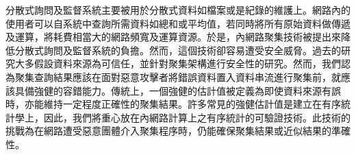 	
   分散式詢問及監督系統主要被用於分散式資料如檔案或是紀錄的維護上。網路內的使用者可以自系統中查詢所需資料如總和或平均值，若同時將所有原始資料做傳遞及運算，將耗費相當大的網路頻寬及運算資源。於是，內網路聚集技術被提出來降低分散式詢問及監督系統的負擔。然而，這個技術卻容易遭受安全威脅。過去的研究大多假設資料來源為可信任，並針對聚集架構進行安全性的研究。然而，我們認為聚集查詢結果應該在面對惡意攻擊者將錯誤資料置入資料串流進行聚集前，就應該具備強健的容錯能力。傳統上，一個強健的估計值被定義為即使資料來源有誤時，亦能維持一定程度正確性的聚集結果。許多常見的強健估計值是建立在有序統計學上，因此，我們將重心放在內網路計算上之有序統計的可驗證技術。此技術的挑戰為在網路遭受惡意團體介入聚集程序時，仍能確保聚集結果或近似結果的準確性。